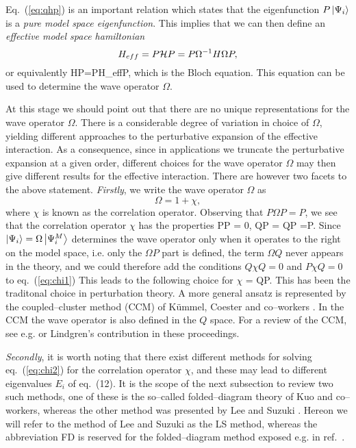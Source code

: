 Eq.\ (\ref{eq:qhp}) is an important relation which states that the eigenfunction
$P\left| \Psi_i \right\rangle$ is a {\em pure model space eigenfunction}. This implies that
we can then define an {\em effective model space hamiltonian} 
\[
H_{eff}=P{\cal H}P = P\Omega^{-1} H \Omega P,
\]
or equivalently
\be
H\Omega P=\Omega PH_{eff}P,
\ee
which is the Bloch \cite{bloch59} equation. This equation can 
be used to determine the wave operator $\Omega$.

At this stage we should point out that there are no unique representations
for the wave operator $\Omega$. There is a considerable degree of variation
in choice of $\Omega$, yielding different approaches to the perturbative
expansion of the effective interaction. As a consequence,
since in applications we truncate the perturbative expansion at a given
order, different choices for the wave operator $\Omega$ may then give
different results for the effective interaction.
There are however two facets to the above statement.
{\em Firstly}, we write the wave operator $\Omega$ as
\[
\Omega = 1 +\chi,
\]
where $\chi$ is known as the correlation operator. Observing
that $P\Omega P = P$, we see that the correlation operator $\chi$
has the properties
\be
P\chi P = 0, \hspace{1cm} Q\Omega P = Q\chi P =\chi P. \label{eq:chi1}
\ee
Since  $\left| \Psi_i \right\rangle=\Omega\left| \Psi_i^{M} \right\rangle$ determines the wave operator
only when it operates to the right on the model space, i.e. only the
$\Omega P$  part is defined, the term $\Omega Q$
never appears in the theory,
and we could therefore add the conditions $Q\chi Q =0$ and $P\chi Q =0$
to eq.\ (\ref{eq:chi1}) This leads to the following choice for $\chi$
\be
\chi = Q\chi P. \label{eq:chi2}
\ee
This has been the traditonal choice in perturbation theory.
A more general ansatz is represented by the coupled--cluster method
(CCM) of K\"{u}mmel, Coester and co--workers \cite{klz76}. In the CCM
the wave operator is also defined in the $Q$ space. For a
review of the CCM, see e.g. \cite{lm85} or Lindgren's contribution
in these proceedings.

{\em Secondly}, it is worth noting that there exist different methods for
solving  eq.\
(\ref{eq:chi2}) for the correlation operator $\chi$, and these may lead to
different eigenvalues $E_i$ of eq.\ (12).
It is the scope
of the next subsection to review two such methods, one of these
is the so--called folded--diagram theory of Kuo and co--workers, whereas
the other method was presented by Lee and Suzuki \cite{ls80}.
Hereon we will refer to the method of Lee and Suzuki as the LS method,
whereas the abbreviation FD is reserved for the folded--diagram
method exposed e.g. in ref.\ \cite{ko90}.


